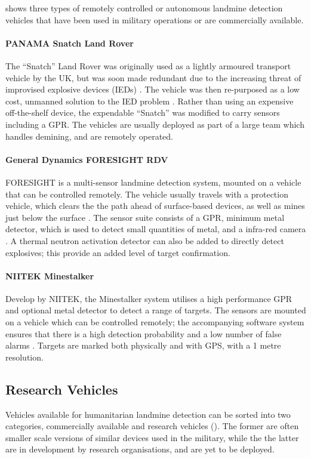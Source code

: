\documentclass[main.tex]{subfiles}
\begin{document}
 shows three types of remotely controlled or autonomous landmine detection vehicles that have been used in military operations or are commercially available. 

\paragraph{PANAMA Snatch Land Rover}  The ``Snatch'' Land Rover was originally used as a lightly armoured transport vehicle by the UK, but was soon made redundant due to the increasing threat of improvised explosive devices (IEDs) \parencite{think2012}. The vehicle was then re-purposed as a low cost, unmanned solution to the IED problem \parencite{baxter2012}. Rather than using an expensive off-the-shelf device, the  expendable ``Snatch'' was modified to carry sensors including a GPR. The vehicles are usually deployed as part of a large team which handles demining, and are remotely operated.

\paragraph{General Dynamics FORESIGHT RDV} FORESIGHT is a multi-sensor landmine detection system, mounted on a vehicle that can be controlled remotely. The vehicle usually travels with a protection vehicle, which clears the the path ahead of surface-based devices, as well as mines just below the surface \parencite{canada2004}. The sensor suite consists of a GPR, minimum metal detector, which is used to detect small quantities of metal, and a infra-red camera \parencite{general2009}. A thermal neutron activation detector can also be added to directly detect explosives; this provide an added level of target confirmation.

\paragraph{NIITEK Minestalker} Develop by NIITEK, the Minestalker system utilises a high performance GPR and optional metal detector to detect a range of targets. The sensors are mounted on a vehicle which can be controlled remotely; the accompanying software system ensures that there is a high detection probability and a low number of false alarms \parencite{niitek2015}. Targets are marked both physically and with GPS, with a 1 metre resolution. 

\subsection{Research Vehicles}
Vehicles available for humanitarian landmine detection can be sorted into two categories, commercially available and research vehicles (). The former are often smaller scale versions of similar devices used in the military, while the the latter are in development by research organisations, and are yet to be deployed.
\end{document}
